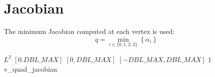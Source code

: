 \section{Jacobian}

The minimum Jacobian computed at each vertex is used:
\[
q = \min_{i\in\{0,1,2,3\}} \left\{ \alpha_i \right\}
\]

%
{$L^2$}%
{$[0.DBL\_MAX]$}%
{$[0,DBL\_MAX]$}%
{$[-DBL\_MAX,DBL\_MAX]$}%
{$1$}%
{\cite{knu:00}}%
{v\_quad\_jacobian}%

